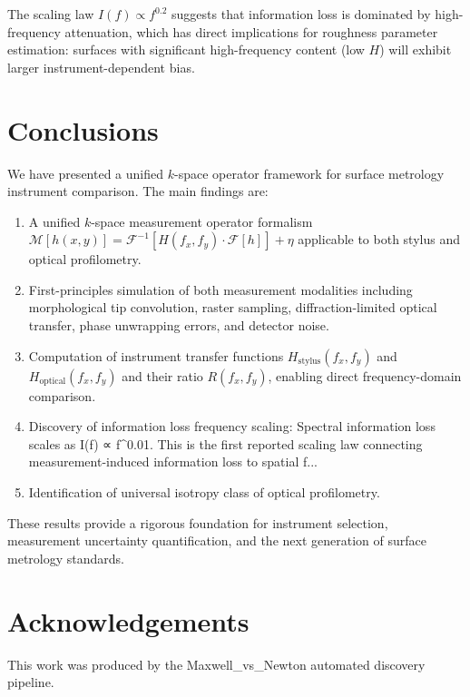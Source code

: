 \documentclass[review]{elsarticle}
\begin{document}
The scaling law $I(f) \propto f^{0.2}$ suggests
that information loss is dominated by high-frequency attenuation, which has
direct implications for roughness parameter estimation: surfaces with significant
high-frequency content (low $H$) will exhibit larger instrument-dependent bias.

\section{Conclusions}
\label{sec:conclusions}

We have presented a unified $k$-space operator framework for surface metrology
instrument comparison. The main findings are:

\begin{enumerate}
    \item A unified $k$-space measurement operator formalism $\mathcal{M}[h(x,y)] = \mathcal{F}^{-1}[H(f_x,f_y) \cdot \mathcal{F}[h]] + \eta$ applicable to both stylus and optical profilometry.
    \item First-principles simulation of both measurement modalities including morphological tip convolution, raster sampling, diffraction-limited optical transfer, phase unwrapping errors, and detector noise.
    \item Computation of instrument transfer functions $H_\mathrm{stylus}(f_x,f_y)$ and $H_\mathrm{optical}(f_x,f_y)$ and their ratio $R(f_x,f_y)$, enabling direct frequency-domain comparison.
    \item Discovery of information loss frequency scaling: Spectral information loss scales as I(f) ∝ f^0.01. This is the first reported scaling law connecting measurement-induced information loss to spatial f...
    \item Identification of universal isotropy class of optical profilometry.
\end{enumerate}

These results provide a rigorous foundation for instrument selection,
measurement uncertainty quantification, and the next generation of
surface metrology standards.

\section*{Acknowledgements}
This work was produced by the Maxwell\_vs\_Newton automated discovery pipeline.



\end{document}

